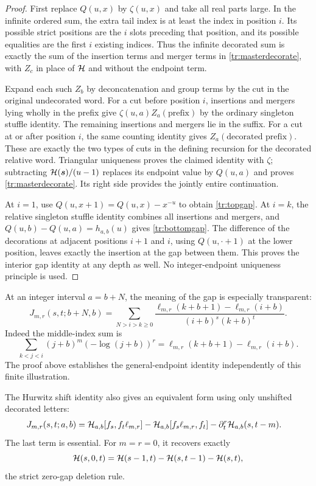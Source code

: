 \begin{proof}
First replace $Q(u,x)$ by $\zeta(u,x)$ and take all real parts
large. In the infinite ordered sum, the extra tail index is at least
the index in position $i$. Its possible strict positions are the $i$
slots preceding that position, and its possible equalities are the
first $i$ existing indices. Thus the infinite decorated sum is exactly
the sum of the insertion terms and merger terms in
\eqref{tr:masterdecorate}, with $Z_c$ in place of $\mathcal H$ and
without the endpoint term.

Expand each such $Z_b$ by deconcatenation and group terms by the cut
in the original undecorated word. For a cut before position $i$,
insertions and mergers lying wholly in the prefix give
$\zeta(u,a)Z_a(\text{prefix})$ by the ordinary singleton stuffle
identity. The remaining insertions and mergers lie in the suffix.
For a cut at or after position $i$, the same counting identity gives
$Z_a(\text{decorated prefix})$. These are exactly the two types
of cuts in the defining recursion for the decorated relative word.
Triangular uniqueness proves the claimed identity with $\zeta$;
subtracting $\mathcal H(\boldsymbol s)/(u-1)$ replaces its endpoint value
by $Q(u,a)$ and proves \eqref{tr:masterdecorate}. Its right side
provides the jointly entire continuation.

At $i=1$, use $Q(u,x+1)=Q(u,x)-x^{-u}$ to obtain
\eqref{tr:topgap}. At $i=k$, the relative singleton stuffle identity
combines all insertions and mergers, and
$Q(u,b)-Q(u,a)=h_{a,b}(u)$ gives \eqref{tr:bottomgap}.
The difference of the decorations at adjacent positions $i+1$ and $i$,
using $Q(u,\cdot+1)$ at the lower position, leaves exactly the
insertion at the gap between them. This proves the interior gap
identity at any depth as well. No integer-endpoint uniqueness principle
is used.
\end{proof}

At an integer interval $a=b+N$, the meaning of the gap is especially
transparent:
\begin{equation}\label{tr:finitegap}
 J_{m,r}(s,t;b+N,b)=
 \sum_{N>i>k\geq0}
 \frac{\ell_{m,r}(k+b+1)-\ell_{m,r}(i+b)}
      {(i+b)^s(k+b)^t}.
\end{equation}
Indeed the middle-index sum is
\[
 \sum_{k<j<i}(j+b)^m(-\log(j+b))^r
           =\ell_{m,r}(k+b+1)-\ell_{m,r}(i+b).
\]
The proof above establishes the general-endpoint identity independently
of this finite illustration.

The Hurwitz shift identity also gives an equivalent form using only
unshifted decorated letters:
\begin{align}
 J_{m,r}(s,t;a,b)
   ={}&\mathcal H_{a,b}[f_s,f_t\ell_{m,r}]
       -\mathcal H_{a,b}[f_s\ell_{m,r},f_t]
       -\partial_t^r\mathcal H_{a,b}(s,t-m).
 \label{tr:commutator}
\end{align}
The last term is essential. For $m=r=0$, it recovers exactly
\[
 \mathcal H(s,0,t)=\mathcal H(s-1,t)-\mathcal H(s,t-1)-\mathcal H(s,t),
\]
the strict zero-gap deletion rule.

